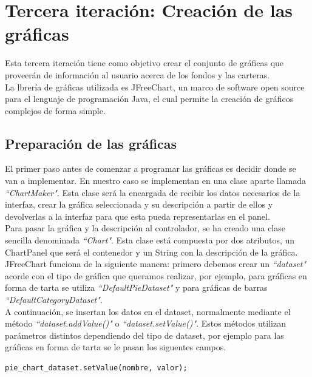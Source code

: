 \documentclass[12pt, a4paper]{book}
\begin{document}
\section{Tercera iteración: Creación de las gráficas}

Esta tercera iteración tiene como objetivo crear el conjunto de gráficas que proveerán de información al usuario acerca de los fondos y las carteras.\\

La lbrería de gráficas utilizada es JFreeChart, un marco de software open source para el lenguaje de programación Java, el cual permite la creación de gráficos complejos de forma simple.

\subsection{Preparación de las gráficas}

El primer paso antes de comenzar a programar las gráficas es decidir donde se van a implementar. En nuestro caso se implementan en una clase aparte llamada \textit{``ChartMaker"}. Esta clase será la encargada de recibir los datos necesarios de la interfaz, crear la gráfica seleccionada y su descripción a partir de ellos y devolverlas a la interfaz para que esta pueda representarlas en el panel.\\

Para pasar la gráfica y la descripción al controlador, se ha creado una clase sencilla denominada \textit{``Chart"}. Esta clase está compuesta por dos atributos, un ChartPanel que será el contenedor y un String con la descripción de la gráfica.\\

JFreeChart funciona de la siguiente manera: primero debemos crear un \textit{``dataset"} acorde con el tipo de gráfica que queramos realizar, por ejemplo, para gráficas en forma de tarta se utiliza \textit{``DefaultPieDataset"} y para gráficas de barras \textit{``DefaultCategoryDataset"}.\\

A continuación, se insertan los datos en el dataset, normalmente mediante el método \textit{``dataset.addValue()"} o \textit{``dataset.setValue()"}. Estos métodos utilizan parámetros distintos dependiendo del tipo de dataset, por ejemplo para las gráficas en forma de tarta se le pasan los siguentes campos.

\begin{verbatim}
pie_chart_dataset.setValue(nombre, valor);
\end{verbatim}
\end{document}
